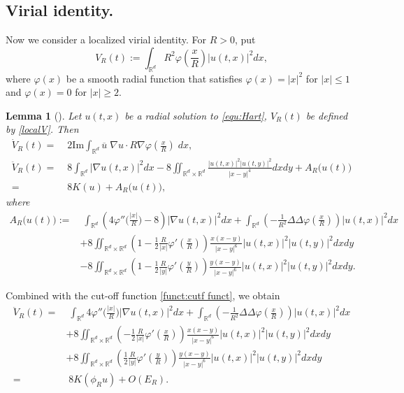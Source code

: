 \documentclass[reqno, 11pt]{amsart}
\numberwithin{equation}{section}
\newcommand{\R}{\mathbb{R}}
\theoremstyle{plain}
\newtheorem{lemma}[theorem]{Lemma}
\theoremstyle{definition}
\numberwithin{equation}{section}
\numberwithin{theorem}{section}
\numberwithin{equation}{section}
\renewcommand{\Im}{\mathrm{Im}}
\numberwithin{equation}{section}
\numberwithin{theorem}{section}
\begin{document}
	\subsection{Virial identity.} Now we consider a localized virial identity. For $R>0$, put
	\begin{equation} \label{localV}
	V_{R}(t):=\int_{\R^d} R^2\varphi\left(\frac{x}{R} \right)|u(t,x)|^2 dx,
	\end{equation}
	where $\varphi(x)$ be a smooth radial function that satisfies $\varphi(x)=|x|^2$ for $|x|\leq 1$ and $\varphi(x)=0$ for $|x|\geq 2$. 
	\begin{lemma}[\cite{MWX:Hart}]
		Let $u(t,x)$ be a radial solution to \eqref{equ:Hart}, $V_{R}(t)$ be
		defined by \eqref{localV}. Then
		\begin{align*}
		\dot{V}_R(t)=&\; 2\Im \int_{\R^d} \overline{u}\; \nabla u \cdot R \nabla\varphi\left(\frac{x}{R} \right)\; dx, \\
		\ddot{V}_R(t)=&\; 8 \int_{\R^d} \big|\nabla u (t,x)\big|^2 dx-8
		\iint_{\R^d\times\R^d}\frac{\big|u(t,x)\big|^2\big|u(t,y)\big|^2}{|x-y|^4} dxdy+ A_R\big(u(t)\big)\\=&\; 8K(u)+A_R\big(u(t)\big),
		\end{align*}
		where
		\begin{align*} A_R\big(u(t)\big):=&\;\int_{\R^d} \left( 4\varphi''\Big(\frac{|x|}{R}\Big)-8 \right) \big|\nabla u (t,x) \big|^2 dx
		+  \int_{\R^d} \left(-\frac{1}{R^2}\Delta\Delta \varphi\left(\frac{x}{R} \right) \right) \big| u(t,x)\big|^2 dx \\
		& + 8\iint_{\R^d\times\R^d}\left(1-\frac{1}{2} \frac{R}{|x|}\varphi'\left(\frac{x}{R}\right)\right)\frac{x(x-y)}{|x-y|^6}|u(t,x)|^2|u(t,y)|^2 dxdy\\& - 8\iint_{\R^d\times\R^d}\left(1-\frac{1}{2} \frac{R}{|y|}\varphi'\left(\frac{y}{R}\right)\right)\frac{y(x-y)}{|x-y|^6}|u(t,x)|^2|u(t,y)|^2 dxdy.
		\end{align*}
	\end{lemma}
	Combined with the cut-off function \eqref{funct:cutf funct}, we obtain
	\begin{equation}\label{est:V 2deri}
	\begin{aligned}
	\ddot{V}_R(t)=&\; \int_{\R^d}4\varphi''\Big(\frac{|x|}{R}\Big)\big|\nabla u (t,x) \big|^2 dx
	+  \int_{\R^d} \left(-\frac{1}{R^2}\Delta\Delta \varphi\left(\frac{x}{R} \right) \right) \big| u(t,x)\big|^2 dx\\&
	+8\iint_{\R^d\times\R^d}\left(-\frac{1}{2} \frac{R}{|x|}\varphi'\left(\frac{x}{R}\right)\right)\frac{x(x-y)}{|x-y|^6}|u(t,x)|^2|u(t,y)|^2 dxdy\\& + 8\iint_{\R^d\times\R^d}\left(\frac{1}{2} \frac{R}{|y|}\varphi'\left(\frac{y}{R}\right)\right)\frac{y(x-y)}{|x-y|^6}|u(t,x)|^2|u(t,y)|^2 dxdy\\=&\;8K\left(\phi_{R}u\right)+O(E_R).
	\end{aligned}
	\end{equation}
\end{document}
